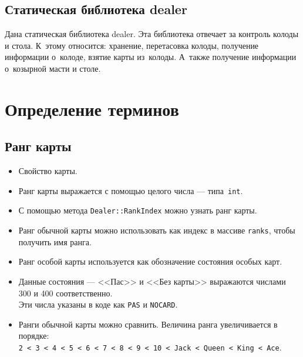 \documentclass[a4paper,12pt]{article}
\begin{document}
    \subsection{Статическая библиотека \textsf{dealer}}
        Дана статическая библиотека \textsf{dealer}.
        Эта библиотека отвечает за контроль колоды и стола.
        К~этому относится: хранение, перетасовка колоды, получение информации о~колоде, взятие карты из~колоды.
        А~также получение информации о~козырной масти и столе.
    
    \section{Определение терминов}
        \subsection{Ранг карты}
            \begin{itemize}
                \item[] Свойство карты.
                \item[] Ранг карты выражается с помощью целого числа --- типа~\texttt{int}.
                \item[] С помощью метода \texttt{Dealer::RankIndex} можно узнать ранг карты.
                \item[] Ранг обычной карты можно использовать как индекс в массиве \texttt{ranks}, чтобы получить имя ранга.
                \item[] Ранг особой карты используется как обозначение состояния особых карт.
                \item[] Данные состояния --- <<Пас>> и <<Без карты>> выражаются числами 300 и 400 соответственно.\\
                        Эти числа указаны в коде как \texttt{PAS} и \texttt{NOCARD}.
                \item[] Ранги обычной карты можно сравнить.
                        Величина ранга увеличивается в порядке:\\
                        \texttt{2 < 3 < 4 < 5 < 6 < 7 < 8 < 9 < 10 < Jack < Queen < King < Ace}.
            \end{itemize}
\end{document}
